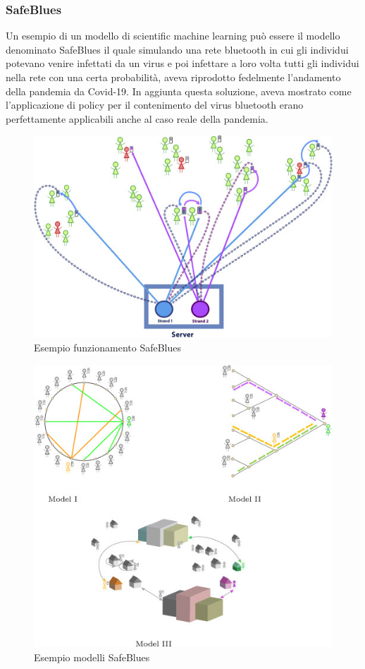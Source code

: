 \subsubsection{SafeBlues}
Un esempio di un modello di scientific machine learning può 
essere il modello denominato SafeBlues 
\cite{10.1371/journal.pdig.0000142} \cite{DANDEKAR2021100220} il quale simulando una 
rete bluetooth in cui gli individui potevano venire infettati 
da un virus e poi infettare a loro volta tutti gli individui 
nella rete con una certa probabilità, aveva riprodotto 
fedelmente l’andamento della pandemia da Covid-19. 
In aggiunta questa soluzione, aveva mostrato come 
l’applicazione di policy per il contenimento del virus 
bluetooth erano perfettamente applicabili anche al caso 
reale della pandemia. 

\begin{figure}
    \includegraphics[width=\linewidth]{img/gr2.jpg}
    \caption{Esempio funzionamento SafeBlues}
    \label{fig:SafeBlues_1}
\end{figure}

\begin{figure}
    \includegraphics[width=\linewidth]{img/gr3.jpg}
    \caption{Esempio modelli SafeBlues}
    \label{fig:SafeBlues_models}
\end{figure}